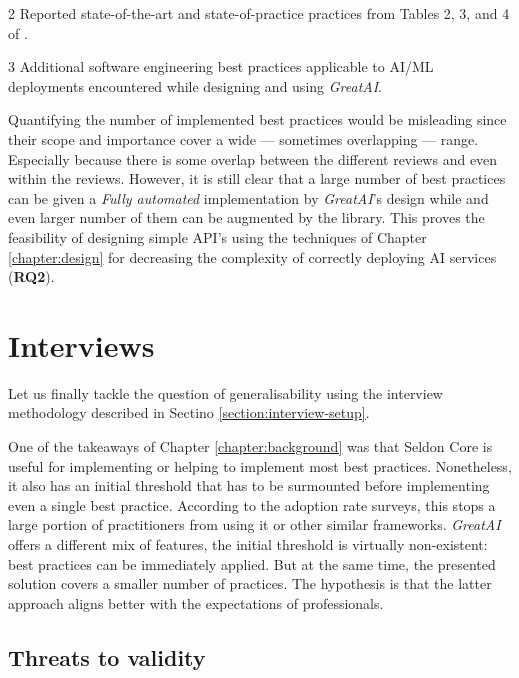 \begin{table}
\begin{threeparttable}
{\begin{tabular}{p{7cm}@{\hskip 0.5cm}l@{\hskip 0cm}c}
\end{tabular}}
\begin{tablenotes}
    \item[2] Reported state-of-the-art and state-of-practice practices from Tables 2, 3, and 4 of \cite{john2020architecting}.
    \item[3] Additional software engineering best practices applicable to AI/ML deployments encountered while designing and using \textit{GreatAI}.
    \end{tablenotes}
\end{threeparttable}
\end{table}

Quantifying the number of implemented best practices would be misleading since their scope and importance cover a wide --- sometimes overlapping --- range. Especially because there is some overlap between the different reviews and even within the reviews. However, it is still clear that a large number of best practices can be given a \textit{Fully automated} implementation by \textit{GreatAI}'s design while and even larger number of them can be augmented by the library. This proves the feasibility of designing simple API's using the techniques of Chapter \ref{chapter:design} for decreasing the complexity of correctly deploying AI services (\textbf{RQ2}).

\section{Interviews} \label{section:interviews}

Let us finally tackle the question of generalisability using the interview methodology described in Sectino \ref{section:interview-setup}.

One of the takeaways of Chapter \ref{chapter:background} was that Seldon Core is useful for implementing or helping to implement most best practices. Nonetheless, it also has an initial threshold that has to be surmounted before implementing even a single best practice. According to the adoption rate surveys, this stops a large portion of practitioners from using it or other similar frameworks. \textit{GreatAI} offers a different mix of features, the initial threshold is virtually non-existent: best practices can be immediately applied. But at the same time, the presented solution covers a smaller number of practices. The hypothesis is that the latter approach aligns better with the expectations of professionals. 

\subsection{Threats to validity}

